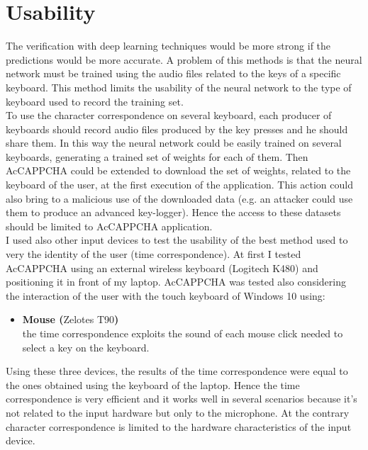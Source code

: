 \section{Usability}
The verification with deep learning techniques would be more strong if the predictions would be more accurate. A problem of this methods is that the neural network must be trained using the audio files related to the keys of a specific keyboard. This method limits the usability of the neural network to the type of keyboard used to record the training set.\\
To use the character correspondence on several keyboard, each producer of keyboards should record audio files produced by the key presses and he should share them. In this way the neural network could be easily trained on several keyboards, generating a trained set of weights for each of them. Then AcCAPPCHA could be extended to download the set of weights, related to the keyboard of the user, at the first execution of the application. This action could also bring to a malicious use of the downloaded data (e.g. an attacker could use them to produce an advanced key-logger). Hence the access to these datasets should be limited to AcCAPPCHA application.\\
I used also other input devices to test the usability of the best method used to very the identity of the user (time correspondence). At first I tested AcCAPPCHA using an external wireless keyboard (Logitech K480) and positioning it in front of my laptop. AcCAPPCHA was tested also considering the interaction of the user with the touch keyboard of Windows 10 using:
\begin{itemize}
\item{\textbf{Mouse (}Zelotes T90\textbf{)}\\
the time correspondence exploits the sound of each mouse click needed to select a key on the keyboard.}
\end{itemize}
Using these three devices, the results of the time correspondence were equal to the ones obtained using the keyboard of the laptop. Hence the time correspondence is very efficient and it works well in several scenarios because it's not related to the input hardware but only to the microphone. At the contrary character correspondence is limited to the hardware characteristics of the input device. 